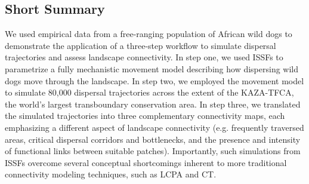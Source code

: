 \documentclass[abstract=on,10pt,a4paper,bibliography=totocnumbered]{article}
\begin{document}
\subsection{Short Summary}
We used empirical data from a free-ranging population of African wild dogs to
demonstrate the application of a three-step workflow to simulate dispersal
trajectories and assess landscape connectivity. In step one, we used ISSFs to
parametrize a fully mechanistic movement model describing how dispersing wild
dogs move through the landscape. In step two, we employed the movement model to
simulate 80,000 dispersal trajectories across the extent of the KAZA-TFCA, the
world's largest transboundary conservation area. In step three, we translated
the simulated trajectories into three complementary connectivity maps, each
emphasizing a different aspect of landscape connectivity (e.g. frequently
traversed areas, critical dispersal corridors and bottlenecks, and the presence
and intensity of functional links between suitable patches). Importantly, such
simulations from ISSFs overcome several conceptual shortcomings inherent to more
traditional connectivity modeling techniques, such as LCPA and CT.

\end{document}
